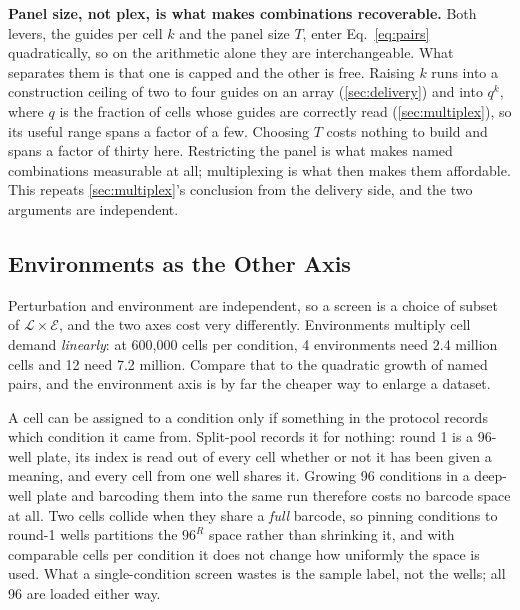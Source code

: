 \begin{keybox}
\textbf{Panel size, not plex, is what makes combinations recoverable.} Both
levers, the guides per cell $k$ and the panel size $T$, enter
Eq.~\ref{eq:pairs} quadratically, so on the arithmetic alone they are
interchangeable. What separates them is that one is capped and the other is
free. Raising $k$ runs into a construction ceiling of two to four guides on an
array (\cref{sec:delivery}) and into $q^{k}$, where $q$ is the fraction of cells
whose guides are correctly read (\cref{sec:multiplex}), so its useful range spans
a factor of a few. Choosing $T$ costs nothing to build and spans a factor of
thirty here. Restricting the
panel is what makes named combinations measurable at all; multiplexing is what
then makes them affordable. This repeats \cref{sec:multiplex}'s conclusion from
the delivery side, and the two arguments are independent.
\end{keybox}

\subsection{Environments as the Other Axis}
\label{sec:environments}

Perturbation and environment are independent, so a screen is a choice of subset
of $\mathcal{L}\times\mathcal{E}$, and the two axes cost very differently.
Environments multiply cell demand \emph{linearly}: at 600{,}000 cells per
condition, 4 environments need 2.4 million cells and 12 need 7.2 million.
Compare that to the quadratic growth of named pairs, and the environment axis is
by far the cheaper way to enlarge a dataset.

 A cell can be
assigned to a condition only if something in the protocol records which condition
it came from. Split-pool records it for nothing: round 1 is a 96-well plate, its
index is read out of every cell whether or not it has been given a meaning, and
every cell from one well shares it. Growing 96 conditions in a deep-well plate
and barcoding them into the same run therefore costs no barcode space at all.
Two cells collide when they share a \emph{full} barcode, so pinning conditions to
round-1 wells partitions the $96^{R}$ space rather than shrinking it, and with
comparable cells per condition it does not change how uniformly the space is
used. What a single-condition screen wastes is the sample label, not the wells;
all 96 are loaded either way.

